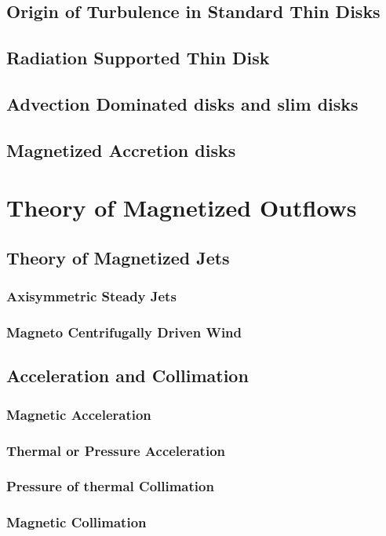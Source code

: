 \documentclass[10pt,a4paper,english]{article}
\begin{document}
\subsection{Origin of Turbulence in Standard Thin Disks}
\subsection{Radiation Supported Thin Disk}
\subsection{Advection Dominated disks and slim disks}
\subsection{Magnetized Accretion disks}

\section{Theory of Magnetized Outflows}
\subsection{Theory of Magnetized Jets}
\subsubsection{Axisymmetric Steady Jets}
\subsubsection{Magneto Centrifugally Driven Wind}
\subsection{Acceleration and Collimation}
\subsubsection{Magnetic Acceleration}
\subsubsection{Thermal or Pressure Acceleration}
\subsubsection{Pressure of thermal Collimation}
\subsubsection{Magnetic Collimation}
\end{document}
